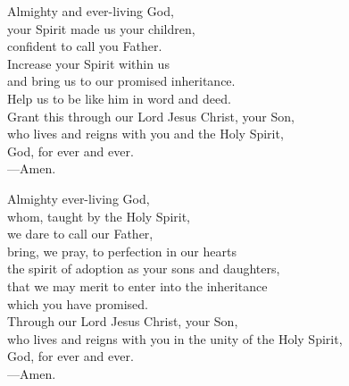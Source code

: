 \prayer


\begin{prayerverse}
Almighty and ever-living God,\\
your Spirit made us your children,\\
confident to call you Father.\\
Increase your Spirit within us\\
and bring us to our promised inheritance.\\
Help us to be like him in word and deed.\\
Grant this through our Lord Jesus Christ, your Son,\\
who lives and reigns with you and the Holy Spirit,\\
God, for ever and ever.\\
{\color{red}---\thinspace}Amen.
\end{prayerverse}


\begin{prayerverse}
Almighty ever-living God,\\
whom, taught by the Holy Spirit,\\
we dare to call our Father,\\
bring, we pray, to perfection in our hearts\\
the spirit of adoption as your sons and daughters,\\
that we may merit to enter into the inheritance\\
which you have promised.\\
Through our Lord Jesus Christ, your Son,\\
who lives and reigns with you in the unity of the Holy Spirit,\\
God, for ever and ever.\\
{\color{red}---\thinspace}Amen.
\end{prayerverse}

